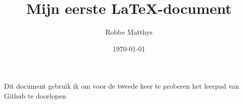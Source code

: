 \documentclass{article}
\title{Mijn eerste \LaTeX -document}
\author{Robbe Matthys}
\date{\today}
\begin{document}
	Dit document gebruik ik om voor de tweede keer te proberen het leerpad van Github te doorlopen
\end{document}
